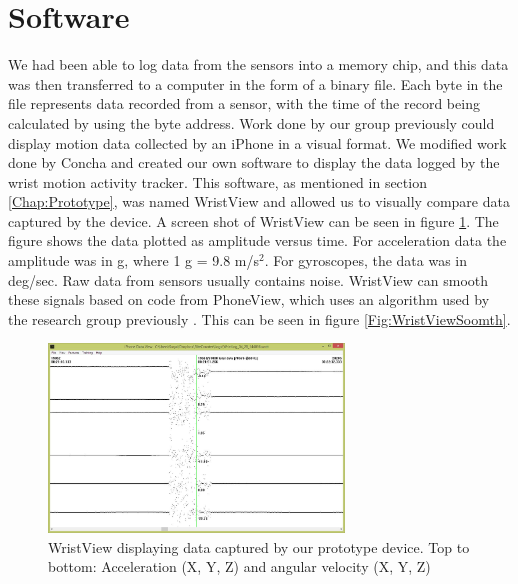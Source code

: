 \section{Software}
\label{Sec:ResultsSoftware}
We had been able to log data from the sensors into a memory chip,
and this data was then transferred to a computer in the form of a binary file.
Each byte in the file represents data recorded from a sensor,
with the time of the record being calculated by using the byte address.
Work done by our group previously could display motion data collected by an iPhone in a visual format.
We modified work done by Concha \cite{concha2014study} and created our own software to display the data logged by the wrist motion activity tracker.
This software, as mentioned in section \ref{Chap:Prototype},
was named WristView and allowed us to visually compare data captured by the device.
A screen shot of WristView can be seen in figure \ref{Fig:WristView}.
The figure shows the data plotted as amplitude versus time.
For acceleration data the amplitude was in g, where 1 g = 9.8 m/s$^2$. For gyroscopes, the data was in deg/sec.
Raw data from sensors usually contains noise.
WristView can smooth these signals based on code from PhoneView,
which uses an algorithm used by the research group previously \cite{concha2014study}.
This can be seen in figure \ref{Fig:WristViewSoomth}.
\begin{figure}
\begin{center}
\includegraphics[width=0.7\textwidth]{images/WristView.jpg}
\caption{WristView displaying data captured by our prototype device. Top to bottom: Acceleration (X, Y, Z) and angular velocity (X, Y, Z)}
\label{Fig:WristView}
\end{center}
\end{figure}

